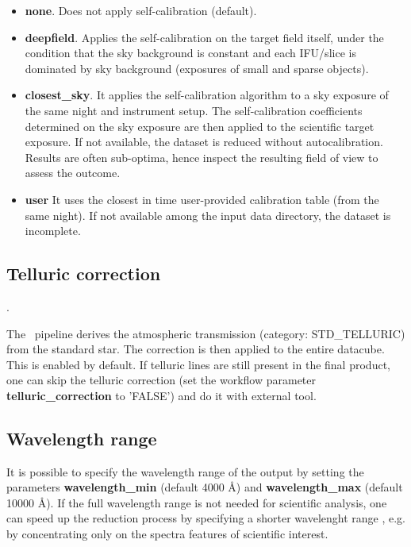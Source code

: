 \begin{itemize}
\item {\bf none}. Does not apply self-calibration (default).

\item {\bf deepfield}. Applies the self-calibration on the target
  field itself, under the condition that the sky background is
  constant and each IFU/slice is dominated by sky background
  (exposures of small and sparse objects).

\item {\bf closest\_sky}. It applies the self-calibration algorithm to
  a sky exposure of the same night and instrument setup.  The
  self-calibration coefficients determined on the sky exposure are
  then applied to the scientific target exposure. If not available,
  the dataset is reduced without autocalibration. Results are often
  sub-optima, hence inspect the resulting field of view to assess the
  outcome.

\item {\bf user} It uses the closest in time user-provided calibration
  table (from the same night). If not available among the input data
  directory, the dataset is incomplete.
\end{itemize}

\subsection{Telluric correction}
\label{sec:configuration_telluric_correction}.

The \instname\ pipeline derives the atmospheric transmission
(category: STD\_TELLURIC) from the standard star. The correction is
then applied to the entire datacube. This is enabled by default.  If
telluric lines are still present in the final product, one can skip
the telluric correction (set the workflow parameter {\bf
  telluric\_correction} to 'FALSE') and do it with external tool.


\subsection{Wavelength range}

It is possible to specify the wavelength range of the output by
setting the parameters {\bf wavelength\_min} (default 4000 \AA) and
{\bf wavelength\_max} (default 10000 \AA). If the full wavelength
range is not needed for scientific analysis, one can speed up the
reduction process by specifying a shorter wavelenght range , e.g. by
concentrating only on the spectra features of scientific interest.


